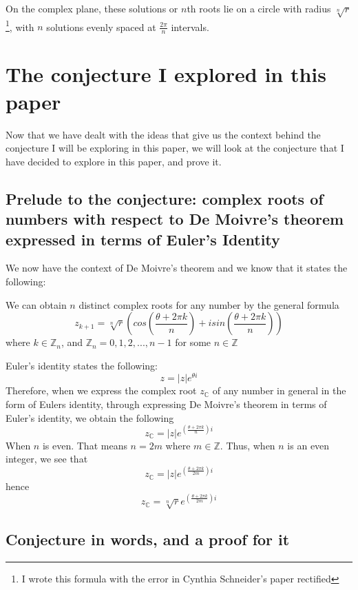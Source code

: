 \documentclass{article}
\begin{document}
On the complex plane, these solutions or \(n\)th roots lie on a circle with radius \(\sqrt[n]{r}\)\footnote{I wrote this formula with the error in Cynthia Schneider's paper rectified}, with \(n\) solutions evenly spaced at \(\frac{2\pi}{n}\) intervals.  

\section{The conjecture I explored in this paper} 

Now that we have dealt with the ideas that give us the context behind the conjecture I will be exploring in this paper, we will look at the conjecture that I have decided to explore in this paper, and prove it. 
\vspace{.1cm} 

\subsection{Prelude to the conjecture: complex roots of numbers with respect to De Moivre's theorem expressed in terms of Euler's Identity}\hypertarget{Prelude}{} 

We now have the context of De Moivre's theorem and we know that it states the following: 
\vspace{.1cm}

We can obtain \(n\) distinct complex roots for any number by the general formula $$z_{k+1} = \sqrt[n]{r}\left(cos\left(\frac{\theta + {2\pi}k}{n}\right) + isin\left(\frac{\theta + {2\pi}k}{n}\right)\right)$$  where \(k \in \mathds{Z}_n\), and \(\mathds{Z}_n = {0,1,2,...,n-1}\) for some \(n \in \mathds{Z}\) 

Euler's identity states the following: \[z = |z|e^{\theta{i}}\] Therefore, when we express the complex root \(z_{\mathds{C}}\) of any number in general in the form of Eulers identity, through expressing De Moivre's theorem in terms of Euler's identity, we obtain the following  \[z_{\mathds{C}} = |z|e^{{\left(\frac{\theta + {2\pi}k}{n}\right)}{i}}\] When \(n\) is even. That means \(n = 2m\) where \(m \in \mathds{Z}\). Thus, when \(n\) is an even integer, we see that \[z_{\mathds{C}} = |z|e^{{\left(\frac{\theta + {2\pi}k}{2m}\right)}{i}}\] hence \[z_{\mathds{C}} = {\sqrt[n]{r}}e^{{\left(\frac{\theta + {2\pi}k}{2m}\right)}{i}}\] 

\subsection{Conjecture in words, and a proof for it}
\end{document}
